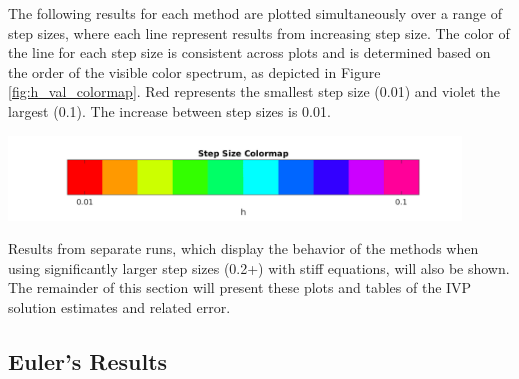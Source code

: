 \documentclass{article}
\begin{document}
The following results for each method are plotted simultaneously over a range of step sizes, where each line represent results from increasing step size. The color of the line for each step size is consistent across plots and is determined based on the order of the visible color spectrum, as depicted in Figure \ref{fig:h_val_colormap}. Red represents the smallest step size (0.01) and violet the largest (0.1). The increase between step sizes is 0.01. 

\begin{center}
  \includegraphics[width=0.9\textwidth]{../output/colormap.png}
  \label{fig:h_val_colormap}
\end{center}

Results from separate runs, which display the behavior of the methods when using significantly larger step sizes (0.2+) with stiff equations, will also be shown. The remainder of this section will present these plots and tables of the IVP solution estimates and related error. 


\subsection{Euler's Results}
\label{results:euler}
\end{document}
